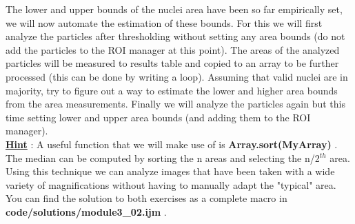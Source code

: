 The lower and upper bounds of the nuclei area have been so far empirically set, we will now automate the estimation of these bounds. For this we will first analyze the particles after thresholding without setting any area bounds (do not add the particles to the ROI manager at this point). The areas of the analyzed particles will be measured to results table and copied to an array to be further processed (this can be done by writing a loop). Assuming that valid nuclei are in majority, try to figure out a way to estimate the lower and higher area bounds from the area measurements. Finally we will analyze the particles again but this time setting lower and upper area bounds (and adding them to the ROI manager).\\

\textbf{\underline{Hint}} : A useful function that we will make use of is \textbf{Array.sort(MyArray)} . The median can be computed by sorting the n areas and selecting the n/2$^{th}$ area.\\
 
Using this technique we can analyze images that have been taken with a wide variety of magnifications without having to manually adapt the "typical" area. You can find the solution to both exercises as a complete macro in \textbf{code/solutions/module3\_02.ijm} .